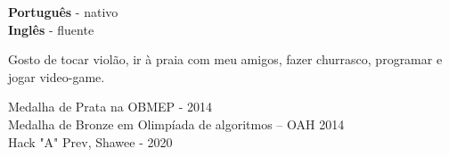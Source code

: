 \documentclass[9pt]{developercv} %
\begin{document}

\begin{minipage}[t]{0.3\textwidth}
  \vspace{-\baselineskip} %


  \textbf{Português} - nativo\\
  \textbf{Inglês} - fluente\\
\end{minipage}
\hfill
\begin{minipage}[t]{0.3\textwidth}
  \vspace{-\baselineskip} %


  Gosto de tocar violão, ir à praia com meu amigos, fazer churrasco, programar e jogar video-game.
\end{minipage}
\hfill
\begin{minipage}[t]{0.3\textwidth}
  \vspace{-\baselineskip} %


  Medalha de Prata na OBMEP - 2014\\
  Medalha de Bronze em Olimpíada de algoritmos – OAH 2014\\
  Hack "A" Prev, Shawee - 2020
\end{minipage}

\end{document}
